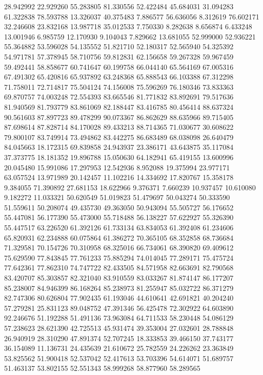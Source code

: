 28.942992
22.929260
55.283805
81.330556
52.422484
45.684031
31.094283
61.322838
78.593788
13.326037
40.375483
7.886577
56.636056
8.312619
76.602171
32.246608
23.832168
13.987718
35.012533
7.750330
8.282638
8.656874
6.433248
13.001946
6.985759
12.170930
9.104043
7.829662
13.681055
52.999000
52.936221
55.364882
53.596028
54.135552
51.821710
52.180317
52.565940
54.325392
54.971781
57.378945
58.710756
59.812831
62.156658
59.267328
59.967459
59.492441
58.858677
60.741647
60.199758
66.044140
65.564169
67.005316
67.491302
65.420816
65.937892
63.248368
65.888543
66.103388
67.312298
71.758011
72.714817
75.504124
74.156008
75.596269
76.180346
73.833363
69.870757
74.003248
72.554393
83.665546
81.771832
83.892691
79.517636
81.940569
81.793779
83.861069
82.188447
83.416785
80.456414
88.637324
90.561603
87.897723
89.478299
90.073367
86.862629
88.635966
89.715405
87.698614
87.828714
84.170028
89.433213
88.714365
71.030677
30.608622
79.800107
83.749914
73.494862
83.442275
86.683489
68.038098
26.640479
84.045663
18.172315
69.839858
24.943937
23.386171
43.643875
35.117084
37.373775
18.181352
19.896788
15.050630
64.182941
65.419155
13.600996
20.045480
15.991086
17.297953
12.542936
8.952088
19.375994
23.977171
63.057524
13.971989
20.142457
11.102216
14.334692
17.820767
15.358178
9.384055
71.390892
27.681153
18.622966
9.376371
7.660239
10.937457
10.610080
9.182272
11.033321
50.620549
51.019823
51.479697
50.043274
50.333590
51.559611
50.208074
49.435730
49.363050
50.943094
55.505727
56.176652
55.447081
56.177390
55.473000
55.718488
56.138227
57.622927
55.326390
55.447517
63.226520
61.392126
61.733134
63.834053
61.392408
61.234606
65.820931
62.234888
60.075864
61.386272
70.365105
68.352858
68.736684
71.329581
70.154726
70.310958
68.325016
66.734061
68.390820
69.409612
75.629590
77.843845
77.761233
75.885294
74.014045
77.289171
75.475724
77.642361
77.862310
74.747722
82.433505
84.571958
82.663691
82.790568
83.420707
85.303857
82.321040
83.910559
83.033267
81.874147
86.177207
85.238007
84.946399
86.168264
85.238973
81.255947
85.032722
86.371279
82.747306
80.626804
77.902435
61.193046
44.610641
42.691821
40.204240
57.279281
25.831123
89.048752
47.391346
56.425478
72.302922
64.603890
92.246676
51.192288
51.491136
73.963084
64.711533
58.230448
54.086129
57.238623
28.621390
42.725513
45.931474
39.353004
27.032601
28.788848
26.940919
28.310290
47.891374
52.707245
18.333853
39.466150
37.743177
36.154089
11.136731
24.435639
21.610672
25.782559
24.226262
23.363849
53.825562
51.900418
52.537042
52.417613
53.703396
54.614071
51.689757
51.463137
53.802155
52.551343
58.999268
58.877960
58.289565
